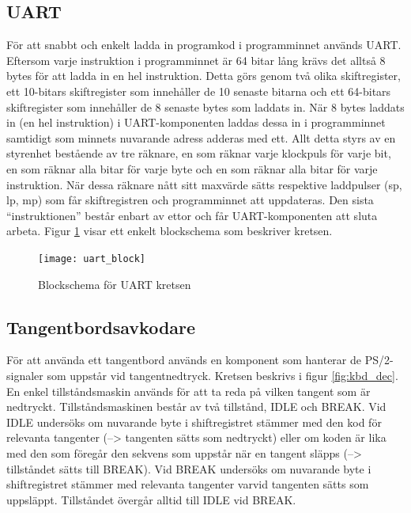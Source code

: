 \documentclass[a4paper]{article}
\begin{document}
    \subsection{UART}
    För att snabbt och enkelt ladda in programkod i programminnet används UART.
    Eftersom varje instruktion i programminnet är 64 bitar lång krävs det alltså 8
    bytes för att ladda in en hel instruktion. Detta görs genom två olika
    skiftregister, ett 10-bitars skiftregister som innehåller de 10 senaste bitarna
    och ett 64-bitars skiftregister som innehåller de 8 senaste bytes som laddats
    in. När 8 bytes laddats in (en hel instruktion) i UART-komponenten laddas dessa
    in i programminnet samtidigt som minnets nuvarande adress adderas med ett.
    Allt detta styrs av en styrenhet bestående av tre räknare, en som räknar varje
    klockpuls för varje bit, en som räknar alla bitar för varje byte och en som
    räknar alla bitar för varje instruktion. När dessa räknare nått sitt maxvärde
    sätts respektive laddpulser (sp, lp, mp) som får skiftregistren och
    programminnet att uppdateras. Den sista “instruktionen” består enbart av ettor
    och får UART-komponenten att sluta arbeta. Figur \ref{fig:uart_block} visar ett enkelt blockschema
    som beskriver kretsen. 

    \begin{figure}[H]
        \centering
        \texttt{[image: uart\_block]}
        \caption{Blockschema för UART kretsen}
        \label{fig:uart_block}
    \end{figure}



    \subsection{Tangentbordsavkodare}

    För att använda ett tangentbord används en komponent som hanterar de
    PS/2-signaler som uppstår vid tangentnedtryck. Kretsen beskrivs i figur
    \ref{fig:kbd_dec}. En
    enkel tillståndsmaskin används för att ta reda på vilken tangent som är
    nedtryckt. Tillståndsmaskinen består av två tillstånd, IDLE och BREAK. Vid IDLE
    undersöks om nuvarande byte i shiftregistret stämmer med den kod för relevanta
    tangenter (--> tangenten sätts som nedtryckt) eller om koden är lika med den som
    föregår den sekvens som uppstår när en tangent släpps (--> tillståndet sätts till
    BREAK). Vid BREAK undersöks om nuvarande byte i shiftregistret stämmer med
    relevanta tangenter varvid tangenten sätts som uppsläppt. Tillståndet övergår
    alltid till IDLE vid BREAK.  
\end{document}
